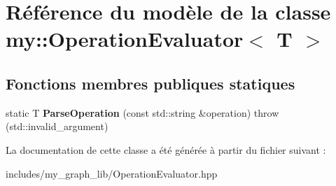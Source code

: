 \hypertarget{classmy_1_1OperationEvaluator}{}\section{Référence du modèle de la classe my\+:\+:Operation\+Evaluator$<$ T $>$}
\label{classmy_1_1OperationEvaluator}
\subsection*{Fonctions membres publiques statiques}
\begin{DoxyCompactItemize}
\item 
\mbox{\label{classmy_1_1OperationEvaluator_aa9bb54881bfe3734ae5e4da71d013a6e}} 
static T {\bfseries Parse\+Operation} (const std\+::string \&operation)  throw (std\+::invalid\+\_\+argument)
\end{DoxyCompactItemize}


La documentation de cette classe a été générée à partir du fichier suivant \+:\begin{DoxyCompactItemize}
\item 
includes/my\+\_\+graph\+\_\+lib/Operation\+Evaluator.\+hpp\end{DoxyCompactItemize}
